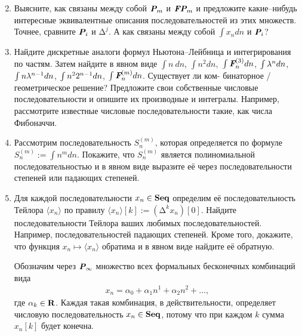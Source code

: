 \begin{enumerate}
\setcounter{enumi}{1}
\item Выясните, как связаны между собой $\text{\bfseries\itshape P}_m$ и $\text{\bfseries\itshape FP}_m$ и предложите какие--нибудь интересные эквивалентные описания последовательностей из этих множеств. Точнее, сравните $\text{\bfseries\itshape P}_i$ и $\text{Δ}^{j}$. А как связаны между собой $\int x_n dn$ и $\text{\bfseries\itshape P}_i$? 
\item Найдите дискретные аналоги формул Ньютона--Лейбница и интегрирования по частям. Затем найдите в явном виде $\int n\ dn$, $\int n^2 dn,$
$\int \text{\bfseries\itshape F}_n^{(3)} dn$,
$\int {\rm \lambda}^n dn$,
$\int n {\rm \lambda}^{n-1} dn$,
$\int n^2 {\rm 2}^{n-1} dn$,
$\int \text{\bfseries\itshape F}_n^{(m)} dn$. Существует ли ком- бинаторное / геометрическое решение? Предложите свои собственные числовые последовательности и опишите их производные и интегралы. Например, рассмотрите известные числовые последовательности такие, как числа Фибоначчи.

\item Рассмотрим последовательность $S_n^{(m)}$, которая определяется по формуле $S_n^{(m)} := \int n^m dn$. Покажите, что $S_n^{(m)}$ является полиномиальной последовательностью и в явном виде выразите её через последовательности степеней или падающих степеней. 

\item Для каждой последовательности $x_n \in \text{\bfseries Seq}$ определим её последовательность Тейлора $\langle x_n \rangle$ по правилу $\langle x_n \rangle [k] := (\text{Δ}^k x_n)[0]$. Найдите последовательности Тейлора ваших любимых последовательностей. Например, последовательностей падающих степеней. Кроме того, докажите, что функция $x_n \mapsto \langle x_n \rangle$ обратима и в явном виде найдите её обратную.

Обозначим через $\text{\bfseries\itshape P}_\infty$ множество всех формальных бесконечных комбинаций вида
\begin{align*}
x_n = \alpha_0 + \alpha_1 n^{\underline{1}} + \alpha_2 n^{\underline{2}} + \ldots,
\end{align*}
где $\alpha_k \in \text{\bfseries R}$. Каждая такая комбинация, в действительности, определяет числовую последовательность $x_n \in \text{\bfseries Seq}$, потому что при каждом $k$ сумма $x_n[k]$ будет конечна.


\end{enumerate}
